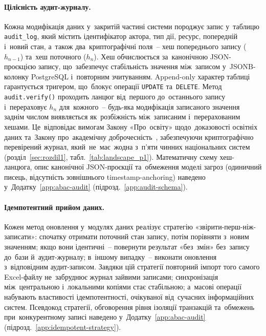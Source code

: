 \paragraph*{\textbf{Цілісність аудит-журналу.}}
\label{sec:p2-arch-audit}

Кожна модифікація даних у~закритій частині системи породжує запис у~таблицю \texttt{audit\_log}, який містить ідентифікатор актора, тип дії, ресурс, попередній і~новий стан, а~також два~криптографічні поля~-- хеш попереднього запису ($h_{n-1}$) та~хеш поточного ($h_n$). Хеш обчислюється за~канонічною JSON-проєкцією запису, що~забезпечує стабільність значення між~записом у~JSONB-колонку PostgreSQL і~повторним зчитуванням. Append-only характер таблиці гарантується тригером, що~блокує операції \texttt{UPDATE} та~\texttt{DELETE}. Метод \texttt{audit.verify()} проходить ланцюг від~першого до~останнього запису і~перераховує $h_n$ для~кожного~-- будь-яка модифікація записаного значення заднім числом виявляється як~розбіжність між~записаним і~перерахованим хешами. Це~відповідає вимогам Закону «Про~освіту» щодо~доказовості освітніх даних та~Закону про~академічну доброчесність~\cite{AkademichnaDobrochesnist2024}, забезпечуючи криптографічно перевірений журнал, який~не~має~жодна з~п'яти чинних національних систем (розділ~\ref{sec:rozdil1}, табл.~\ref{tab:landscape_p1}). Математичну схему хеш-ланцюга, опис канонічної JSON-проєкції та~обмеження моделі загроз (одиничний писець, відсутність зовнішнього timestamp-anchoring) наведено у~Додатку~\ref{app:abac-audit} (підрозд.~\ref{app:audit-schema}).

\paragraph*{\textbf{Ідемпотентний прийом даних.}}
\label{sec:p2-arch-idempotent}

Кожен метод оновлення у~модулях даних реалізує стратегію «звірити-перш-ніж-записати»: спочатку отримати поточний стан запису, потім порівняти з~новим значенням; якщо вони ідентичні~-- повернути результат «без~змін» без~запису до~бази й~аудит-журналу; в~іншому випадку~-- виконати оновлення з~відповідним аудит-записом. Завдяки цій стратегії повторний імпорт того самого Excel-файлу не~забруднює журнал зайвими записами; синхронізація між~центральною і~локальними копіями стає стабільною; а~масові операції набувають властивості ідемпотентності, очікуваної від~сучасних інформаційних систем. Псевдокод стратегії, обговорення рівня ізоляції транзакцій та~обмежень при~конкурентному записі наведено у~Додатку~\ref{app:abac-audit} (підрозд.~\ref{app:idempotent-strategy}).

